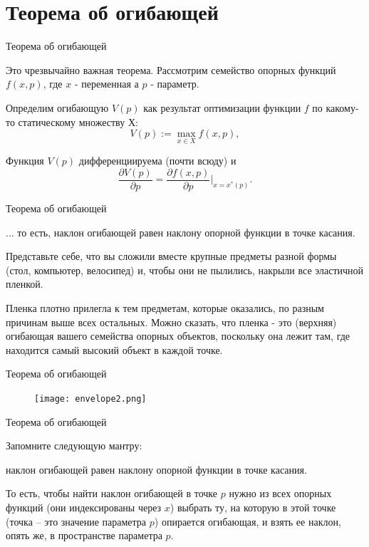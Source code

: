\documentclass{beamer}
\begin{document}
\section{Теорема об огибающей}

\begin{frame}{Теорема об огибающей}

Это чрезвычайно важная теорема. Рассмотрим семейство опорных функций $f(x, p)$, где $x$ - переменная а $p$ - параметр. 

Определим огибающую $V(p)$ как результат оптимизации функции $f$ по какому-то статическому множеству $Х$: 
$$ V(p) := \max_{x \in X} f(x, p),$$

\begin{theorem}[Об огибающей]
Функция $V(p)$ дифференциируема (почти всюду) и 
$$\frac{\partial V(p)}{\partial p} = \frac{\partial f(x, p)}{\partial p}|_{x = x^{\ast}(p)}.$$
\end{theorem}

\end{frame}

\begin{frame}{Теорема об огибающей}

... то есть, наклон огибающей равен наклону опорной функции в точке касания.

Представьте себе, что вы сложили вместе крупные предметы разной формы (стол, компьютер, велосипед) и, чтобы они не пылились, накрыли все эластичной пленкой. 

Пленка плотно прилегла к тем предметам, которые оказались, по разным причинам выше всех остальных. Можно сказать, что пленка - это (верхняя) огибающая вашего семейства опорных объектов, поскольку она лежит там, где находится самый высокий объект в каждой точке.

\end{frame}

\begin{frame}{Теорема об огибающей}

\begin{figure}[hbt]
\centering
\texttt{[image: envelope2.png]}
\end{figure}

\end{frame}

\begin{frame}{Теорема об огибающей}

Запомните следующую мантру: 

\alert{наклон огибающей равен наклону опорной функции в точке касания}. 

То есть, чтобы найти наклон огибающей в точке $p$ нужно из всех опорных функций (они индексированы через $x$) выбрать ту, на которую в этой точке (точка – это значение параметра $p$) опирается огибающая, и взять ее наклон, опять же, в пространстве параметра $p$. 

\end{frame}
\end{document}
